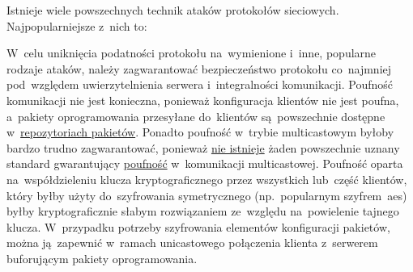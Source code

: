 \documentclass[thesis]{subfiles}
\begin{document}
Istnieje wiele powszechnych technik ataków protokołów sieciowych. Najpopularniejsze z~nich to:\mynobreakpar


W~celu uniknięcia podatności protokołu na~wymienione i~inne, popularne rodzaje ataków, należy zagwarantować bezpieczeństwo protokołu co~najmniej pod~względem uwierzytelnienia serwera i~integralności komunikacji. Poufność komunikacji nie jest konieczna, ponieważ konfiguracja klientów nie jest poufna, a~pakiety oprogramowania przesyłane do~klientów są~powszechnie dostępne w~\href{https://wiki.archlinux.org/index.php/official_repositories}{repozytoriach pakietów}. Ponadto poufność w~trybie multicastowym byłoby bardzo trudno zagwarantować, ponieważ \href{https://www.google.pl/search?q=multicast+encryption}{nie istnieje} żaden powszechnie uznany standard gwarantujący \href{http://www.cisco.com/c/dam/en/us/products/collateral/ios-nx-os-software/ip-multicast/prod_presentation0900aecd80473105.pdf}{poufność} w~komunikacji multicastowej. Poufność oparta na~współdzieleniu klucza kryptograficznego przez wszystkich lub~część klientów, który byłby użyty do~szyfrowania symetrycznego (np.~popularnym szyfrem~\gls{aes}) byłby kryptograficznie słabym rozwiązaniem ze~względu na~powielenie tajnego klucza. W~przypadku potrzeby szyfrowania elementów konfiguracji pakietów, można ją~zapewnić w~ramach unicastowego połączenia klienta z~serwerem buforującym pakiety oprogramowania.
\end{document}
